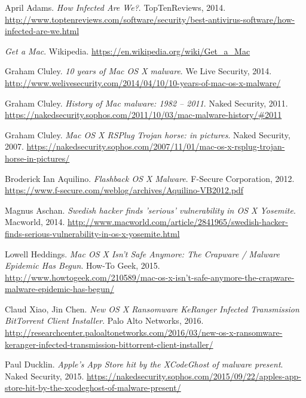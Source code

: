 \documentclass[polish]{kbk}
\begin{document}
\begin{thebibliography}{9}

  April Adams.
  \emph{How Infected Are We?}.
  TopTenReviews, 2014.
  \url{http://www.toptenreviews.com/software/security/best-antivirus-software/how-infected-are-we.html}
  
  \emph{Get a Mac}.
  Wikipedia.
  \url{https://en.wikipedia.org/wiki/Get_a_Mac}
  
  Graham Cluley.
  \emph{10 years of Mac OS X malware}.
  We Live Security, 2014.
  \url{http://www.welivesecurity.com/2014/04/10/10-years-of-mac-os-x-malware/}
  
  Graham Cluley.
  \emph{History of Mac malware: 1982 – 2011}.
  Naked Security, 2011.
  \url{https://nakedsecurity.sophos.com/2011/10/03/mac-malware-history/#2011}
  
  Graham Cluley.
  \emph{Mac OS X RSPlug Trojan horse: in pictures}.
  Naked Security, 2007.
  \url{https://nakedsecurity.sophos.com/2007/11/01/mac-os-x-rsplug-trojan-horse-in-pictures/}
  
  Broderick Ian Aquilino.
  \emph{Flashback OS X Malware}.
  F-Secure Corporation, 2012.
  \url{https://www.f-secure.com/weblog/archives/Aquilino-VB2012.pdf}
  
  Magnus Aschan.
  \emph{Swedish hacker finds 'serious' vulnerability in OS X Yosemite}.
  Macworld, 2014.
  \url{http://www.macworld.com/article/2841965/swedish-hacker-finds-serious-vulnerability-in-os-x-yosemite.html}
  
  Lowell Heddings.
  \emph{Mac OS X Isn’t Safe Anymore: The Crapware / Malware Epidemic Has Begun}.
  How-To Geek, 2015.
  \url{http://www.howtogeek.com/210589/mac-os-x-isn’t-safe-anymore-the-crapware-malware-epidemic-has-begun/}
  
  Claud Xiao, Jin Chen.
  \emph{New OS X Ransomware KeRanger Infected Transmission BitTorrent Client Installer}.
  Palo Alto Networks, 2016.
  \url{http://researchcenter.paloaltonetworks.com/2016/03/new-os-x-ransomware-keranger-infected-transmission-bittorrent-client-installer/}
  
  Paul Ducklin.
  \emph{Apple’s App Store hit by the XCodeGhost of malware present}.
  Naked Security, 2015.
  \url{https://nakedsecurity.sophos.com/2015/09/22/apples-app-store-hit-by-the-xcodeghost-of-malware-present/}
  

\end{thebibliography}
\end{document}
